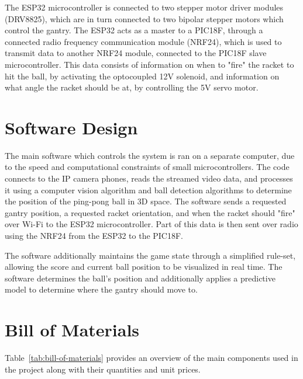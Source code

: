 The ESP32 microcontroller is connected to two stepper motor driver modules (DRV8825), which are in turn connected to two bipolar stepper motors which control the gantry. The ESP32 acts as a master to a PIC18F, through a connected radio frequency communication module (NRF24), which is used to transmit data to another NRF24 module, connected to the PIC18F slave microcontroller. This data consists of information on when to "fire" the racket to hit the ball, by activating the optocoupled 12V solenoid, and information on what angle the racket should be at, by controlling the 5V servo motor.

\section{Software Design}
The main software which controls the system is ran on a separate computer, due to the speed and computational constraints of small microcontrollers. The code connects to the IP camera phones, reads the streamed video data, and processes it using a computer vision algorithm and ball detection algorithms to determine the position of the ping-pong ball in 3D space. The software sends a requested gantry position, a requested racket orientation, and when the racket should "fire" over Wi-Fi to the ESP32 microcontroller. Part of this data is then sent over radio using the NRF24 from the ESP32 to the PIC18F.

The software additionally maintains the game state through a simplified rule-set, allowing the score and current ball position to be visualized in real time. The software determines the ball's position and additionally applies a predictive model to determine where the gantry should move to.


\section{Bill of Materials}

Table~\ref{tab:bill-of-materials} provides an overview of the main components used in the project along with their quantities and unit prices.

